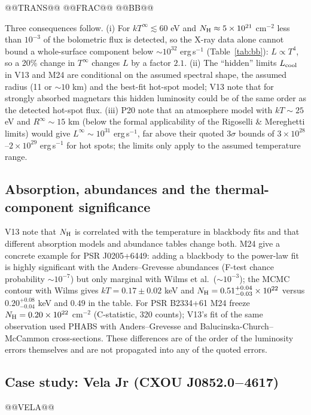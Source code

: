 \documentclass[11pt,a4paper]{article}
\begin{document}
@@TRANS@@
@@FRAC@@
@@BB@@

Three consequences follow. (i) For $kT^\infty\lesssim60$ eV and $N_{\rm H}\approx5\times10^{21}$ cm$^{-2}$ less than $10^{-3}$ of the bolometric flux is detected, so the X-ray data alone cannot bound a whole-surface component below $\sim10^{32}$ erg\,s$^{-1}$ (Table~\ref{tab:bb}): $L\propto T^4$, so a 20\% change in $T^\infty$ changes $L$ by a factor $2.1$. (ii) The ``hidden'' limits $L_{\rm cool}$ in V13 and M24 are conditional on the assumed spectral shape, the assumed radius (11 or $\sim10$ km) and the best-fit hot-spot model; V13 note that for strongly absorbed magnetars this hidden luminosity could be of the same order as the detected hot-spot flux. (iii) P20 note that an atmosphere model with $kT\sim25$ eV and $R^\infty\sim15$ km (below the formal applicability of the Rigoselli \& Mereghetti limits) would give $L^\infty\sim10^{31}$ erg\,s$^{-1}$, far above their quoted $3\sigma$ bounds of $3\times10^{28}$--$2\times10^{29}$ erg\,s$^{-1}$ for hot spots; the limits only apply to the assumed temperature range.

\subsection{Absorption, abundances and the thermal-component significance}
V13 note that $N_{\rm H}$ is correlated with the temperature in blackbody fits and that different absorption models and abundance tables change both. M24 give a concrete example for PSR J0205+6449: adding a blackbody to the power-law fit is highly significant with the Anders--Grevesse abundances (F-test chance probability $\sim10^{-7}$) but only marginal with Wilms et al.\ ($\sim10^{-3}$); the MCMC contour with Wilms gives $kT=0.17\pm0.02$ keV and $N_{\rm H}=0.51^{+0.04}_{-0.03}\times10^{22}$ versus $0.20^{+0.08}_{-0.04}$ keV and $0.49$ in the table. For PSR B2334+61 M24 freeze $N_{\rm H}=0.20\times10^{22}$ cm$^{-2}$ (C-statistic, 320 counts); V13's fit of the same observation used PHABS with Anders--Grevesse and Balucinska-Church--McCammon cross-sections. These differences are of the order of the luminosity errors themselves and are not propagated into any of the quoted errors.

\subsection{Case study: Vela Jr (CXOU J0852.0$-$4617)}\label{sec:vela}
@@VELA@@
\end{document}
